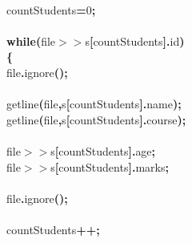 \documentclass[a4paper, 10pt]{article}
\newcommand\SPC{\hspace*{0.6em}}
\newcommand{\CppAIdentifier}[1]{#1}
\newcommand{\CppANumber}[1]{\textcolor[rgb]{0.5,0,0.5}{#1}}
\newcommand{\CppAReservedWord}[1]{\textbf{#1}}
\newcommand{\CppASpace}[1]{\colorbox[rgb]{1,1,1}{#1}}
\newcommand{\CppASymbol}[1]{\textbf{\textcolor[rgb]{1,0,0}{#1}}}
\begin{document}
\begin{ttfamily}
\\
\CppASpace{\SPC \SPC \SPC \SPC }\CppAIdentifier{countStudents}\CppASpace{\SPC }\CppASymbol{=}\CppASpace{\SPC }\CppANumber{0}\CppASymbol{;}\\
\\
\CppASpace{\SPC \SPC \SPC \SPC }\CppAReservedWord{while}\CppASpace{\SPC }\CppASymbol{(}\CppAIdentifier{file}\CppASpace{\SPC }\CppASymbol{$>$$>$}\CppASpace{\SPC }\CppAIdentifier{s}\CppASymbol{[}\CppAIdentifier{countStudents}\CppASymbol{]}\CppASymbol{.}\CppAIdentifier{id}\CppASymbol{)}\\
\CppASpace{\SPC \SPC \SPC \SPC }\CppASymbol{\{}\\
\CppASpace{\SPC \SPC \SPC \SPC \SPC \SPC \SPC \SPC }\CppAIdentifier{file}\CppASymbol{.}\CppAIdentifier{ignore}\CppASymbol{(}\CppASymbol{)}\CppASymbol{;}\\
\\
\CppASpace{\SPC \SPC \SPC \SPC \SPC \SPC \SPC \SPC }\CppAIdentifier{getline}\CppASymbol{(}\CppAIdentifier{file}\CppASymbol{,}\CppASpace{\SPC }\CppAIdentifier{s}\CppASymbol{[}\CppAIdentifier{countStudents}\CppASymbol{]}\CppASymbol{.}\CppAIdentifier{name}\CppASymbol{)}\CppASymbol{;}\\
\CppASpace{\SPC \SPC \SPC \SPC \SPC \SPC \SPC \SPC }\CppAIdentifier{getline}\CppASymbol{(}\CppAIdentifier{file}\CppASymbol{,}\CppASpace{\SPC }\CppAIdentifier{s}\CppASymbol{[}\CppAIdentifier{countStudents}\CppASymbol{]}\CppASymbol{.}\CppAIdentifier{course}\CppASymbol{)}\CppASymbol{;}\\
\\
\CppASpace{\SPC \SPC \SPC \SPC \SPC \SPC \SPC \SPC }\CppAIdentifier{file}\CppASpace{\SPC }\CppASymbol{$>$$>$}\CppASpace{\SPC }\CppAIdentifier{s}\CppASymbol{[}\CppAIdentifier{countStudents}\CppASymbol{]}\CppASymbol{.}\CppAIdentifier{age}\CppASymbol{;}\\
\CppASpace{\SPC \SPC \SPC \SPC \SPC \SPC \SPC \SPC }\CppAIdentifier{file}\CppASpace{\SPC }\CppASymbol{$>$$>$}\CppASpace{\SPC }\CppAIdentifier{s}\CppASymbol{[}\CppAIdentifier{countStudents}\CppASymbol{]}\CppASymbol{.}\CppAIdentifier{marks}\CppASymbol{;}\\
\\
\CppASpace{\SPC \SPC \SPC \SPC \SPC \SPC \SPC \SPC }\CppAIdentifier{file}\CppASymbol{.}\CppAIdentifier{ignore}\CppASymbol{(}\CppASymbol{)}\CppASymbol{;}\\
\\
\CppASpace{\SPC \SPC \SPC \SPC \SPC \SPC \SPC \SPC }\CppAIdentifier{countStudents}\CppASymbol{++}\CppASymbol{;}\\

\end{ttfamily}
\end{document}
